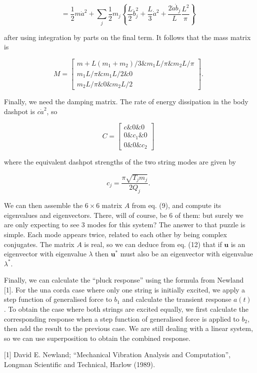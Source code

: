   \begin{equation*}= \frac{1}{2} m \dot{a}^2 +\sum_j{\dfrac{1}{2}m_j 
  \left\lbrace \dfrac{L}{2} \dot{b}_j^2 + \dfrac{L}{3} \dot{a}^2 + \dfrac{2 
  \dot{a} \dot{b}_j}{L} \dfrac{L^2}{\pi}\right\rbrace } \tag{16}\end{equation*} 

  \noindent{}after using integration by parts on the final term. It follows 
  that the mass matrix is 

  \begin{equation*}M =\begin{bmatrix}m+L(m_1+m_2)/3 \& m_1 L /\pi \& m_2 
  L/\pi\\ m_1 L /\pi \& m_1 L /2 \& 0 \\ m_2 L /\pi \& 0 \& m_2 L 
  /2\end{bmatrix} . \tag{17}\end{equation*} 

  Finally, we need the damping matrix. The rate of energy dissipation in the 
  body dashpot is $c \dot{a}^2$, so 

  \begin{equation*}C = \begin{bmatrix}c \& 0 \& 0 \\ 0 \& c_1 \& 0 \\ 0 \& 0 \& 
  c_2 \end{bmatrix} \tag{18}\end{equation*} 

  \noindent{}where the equivalent dashpot strengths of the two string modes are 
  given by 

  \begin{equation*}c_j = \dfrac{\pi \sqrt{T_j m_j}}{2 Q_j} . 
  \tag{19}\end{equation*} 

  We can then assemble the $6 \times 6$ matrix $A$ from eq. (9), and compute 
  its eigenvalues and eigenvectors. There, will of course, be 6 of them: but 
  surely we are only expecting to see 3 modes for this system? The answer to 
  that puzzle is simple. Each mode appears twice, related to each other by 
  being complex conjugates. The matrix $A$ is real, so we can deduce from eq. 
  (12) that if $\mathbf{u}$ is an eigenvector with eigenvalue $\lambda$ then 
  $\mathbf{u}^*$ must also be an eigenvector with eigenvalue $\lambda^*$. 

  Finally, we can calculate the ``pluck response'' using the formula from 
  Newland [1]. For the una corda case where only one string is initially 
  excited, we apply a step function of generalised force to $b_1$ and calculate 
  the transient response $a(t)$. To obtain the case where both strings are 
  excited equally, we first calculate the corresponding response when a step 
  function of generalised force is applied to $b_2$, then add the result to the 
  previous case. We are still dealing with a linear system, so we can use 
  superposition to obtain the combined response. 

  \sectionreferences{}[1] David E. Newland; ``Mechanical Vibration Analysis and 
  Computation'', Longman Scientific and Technical, Harlow (1989). 